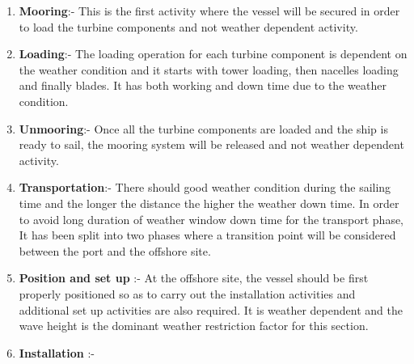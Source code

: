 \begin{enumerate}
\item \textbf{Mooring}:- This is the first activity where the vessel will be secured in order to load the turbine components and not weather dependent activity.
\item \textbf{Loading}:- The loading operation for each turbine component is dependent on the weather condition and it starts with tower loading, then nacelles loading and finally blades. It has both working and down time due to the weather condition.
\item \textbf{Unmooring}:- Once all the turbine components are loaded and the ship is ready to sail, the mooring system will be released and not weather dependent activity.
\item \textbf{Transportation}:- There should good weather condition during the sailing time and the longer the distance the higher the weather down time. In order to avoid long duration of weather window down time  for the transport phase, It has been split into two phases where a transition point will be considered between the port and the offshore site.
\item \textbf{Position and set up} :- At the offshore site, the vessel should be first properly positioned so as to carry out the installation activities and  additional set up activities are also required. It is weather dependent and the wave height is the dominant weather restriction factor for this section.

\item \textbf{Installation} :-
\end{enumerate}